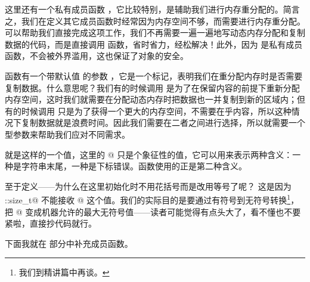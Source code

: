 这里还有一个私有成员函数 \lstinline@realloc@，它比较特别，是辅助我们进行内存重分配的。简言之，我们在定义其它成员函数时经常因为内存空间不够，而需要进行内存重分配。\lstinline@realloc@ 可以帮助我们直接完成这项工作，我们不再需要一遍一遍地写动态内存分配和复制数据的代码，而是直接调用 \lstinline@realloc@ 函数，省时省力，经松解决！此外，因为 \lstinline@realloc@ 是私有成员函数，不会被外界滥用，这也保证了对象的安全。\par
\lstinline@realloc@ 函数有一个带默认值 \lstinline@true@ 的参数 \lstinline@copy@，它是一个标记，表明我们在重分配内存时是否需要复制数据。什么意思呢？我们有的时候调用 \lstinline@realloc@ 是为了在保留内容的前提下重新分配内存空间，这时我们就需要在分配动态内存时把数据也一并复制到新的区域内；但有的时候调用 \lstinline@realloc@ 只是为了获得一个更大的内存空间，不需要在乎内容，所以这种情况下复制数据就是浪费时间。因此我们需要在二者之间进行选择，所以就需要一个 \lstinline@bool@ 型参数来帮助我们应对不同需求。\par
\lstinline@npos@ 就是这样的一个值，这里的 @ 只是个象征性的值，它可以用来表示两种含义：一种是字符串末尾，一种是下标错误。\lstinline@find@ 函数使用的正是第二种含义。\par
至于定义——为什么在这里初始化时不用花括号而是改用等号了呢？ 这是因为 \lstinline@std::size_t@ 不能接收 @ 这个值。我们的实际目的是要通过有符号到无符号转换\footnote{我们到精讲篇中再谈。}，把 @ 变成机器允许的最大无符号值——读者可能觉得有点头大了，看不懂也不要紧啦，直接抄代码就行。\par
下面我就在 \lstinline@public@ 部分中补充成员函数。\par
